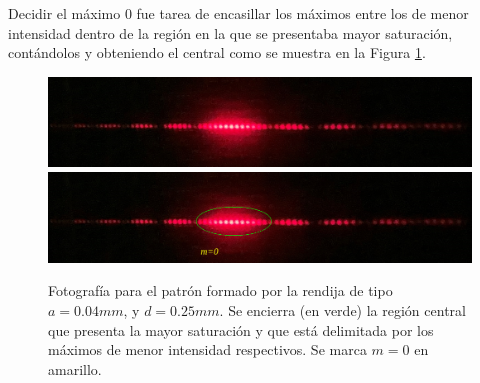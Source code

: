 \documentclass[12pt,a4paper]{article}
\begin{document}
\newpage
Decidir el máximo 0 fue tarea de encasillar los máximos entre los de menor intensidad dentro de la región en la que se presentaba mayor saturación, contándolos y obteniendo el central como se muestra en la Figura \ref{fig:patron}.
\begin{figure}[hbtp!]
	\centering
	\includegraphics[width= 0.7 \linewidth]{2_METODO/image_5}
	\includegraphics[width= 0.7 \linewidth]{2_METODO/image_6_1}
	\caption{Fotografía para el patrón formado por la rendija de tipo \(a= 0.04mm\), y \(d=0.25mm\). Se encierra (en verde) la región central que presenta la mayor saturación y que está delimitada por los máximos de menor intensidad respectivos. Se marca \(m=0\) en amarillo.}
	\label{fig:patron}
\end{figure}
\end{document}
